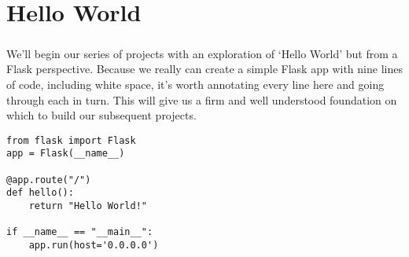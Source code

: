 \chapter{Hello World}
\label{hello_world}
\paragraph{} We'll begin our series of projects with an exploration of `Hello World' but from a Flask perspective. Because we really can create a simple Flask app with nine lines of code, including white space, it's worth annotating every line here and going through each in turn. This will give us a firm and well understood foundation on which to build our subsequent projects.

\begin{lstlisting}
from flask import Flask 
app = Flask(__name__)

@app.route("/")
def hello():
    return "Hello World!"

if __name__ == "__main__":
    app.run(host='0.0.0.0')

\end{lstlisting}

